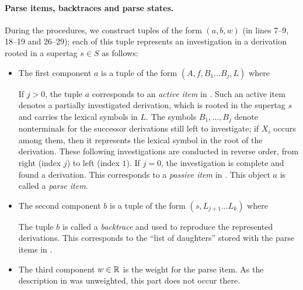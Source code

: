 \documentclass[../../document.tex]{subfiles}
\begin{document}
    \paragraph{Parse items, backtraces and parse states.} During the procedures, we construct tuples of the form \((a, b, w)\) (in lines 7--9, 18--19 and 26--29); each of this tuple represents an investigation in a derivation rooted in a  supertag \(s \in S\) as follows:
    \begin{itemize}
        \item The first component \(a\) is a tuple of the form \((A, f, B_1 \ldots B_j, L)\) where
            If \(j>0\), the tuple \(a\) corresponds to an \emph{active item} in .
            Such an active item denotes a partially investigated derivation, which is rooted in the supertag \(s\) and carries the lexical symbols in \(L\).
            The symbols \(B_1, \ldots, B_j\) denote nonterminals for the successor derivations still left to investigate; if \(X_i\) occurs among them, then it represents the lexical symbol in the root of the derivation.
            These following investigations are conducted in reverse order, from right (index $j$) to left (index $1$).
            If \(j=0\), the investigation is complete and found a derivation. This corresponds to a \emph{passive item} in .
            This object \(a\) is called a \emph{parse item}.
        \item The second component \(b\) is a tuple of the form \((s, L_{j+1} \ldots L_k)\) where
            The tuple \(b\) is called a \emph{backtrace} and used to reproduce the represented derivations.
            This corresponds to the ``list of daughters'' stored with the parse items in .
        \item
            The third component \(w \in \mathbb{R}\) is the weight for the parse item.
            As the description in  was unweighted, this part does not occur there.
    \end{itemize}
\end{document}
